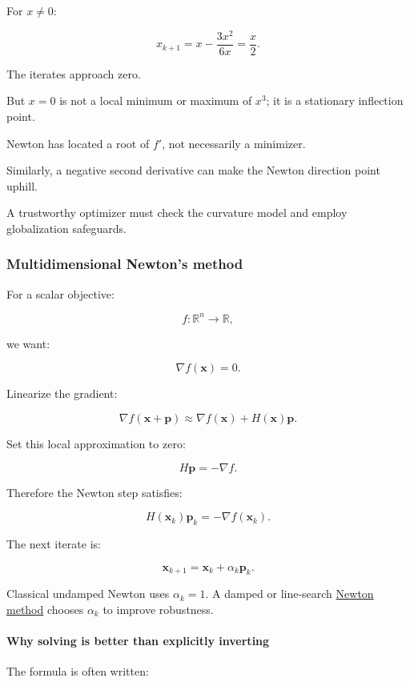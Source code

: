 For \(x\ne0\):

\[
x_{k+1} = x-\frac{3x^2}{6x} =\frac x2.
\]

The iterates approach zero.

But \(x=0\) is not a local minimum or maximum of \(x^3\); it is a stationary inflection point.

Newton has located a root of \(f'\), not necessarily a minimizer.

Similarly, a negative second derivative can make the Newton direction point uphill.

A trustworthy optimizer must check the curvature model and employ globalization safeguards.

\subsubsection{Multidimensional Newton's method}\label{02-foundations-ii-ch026-multidimensional-newtons-method}

For a scalar objective:

\[
f:\mathbb R^n\to\mathbb R,
\]

we want:

\[
\nabla f(\mathbf x)=0.
\]

Linearize the gradient:

\[
\nabla f(\mathbf x+\mathbf p) \approx \nabla f(\mathbf x)+H(\mathbf x)\mathbf p.
\]

Set this local approximation to zero:

\[
H\mathbf p=-\nabla f.
\]

Therefore the Newton step satisfies:

\[
\boxed{ H(\mathbf x_k)\mathbf p_k=-\nabla f(\mathbf x_k) }.
\]

The next iterate is:

\[
\mathbf x_{k+1}=\mathbf x_k+\alpha_k\mathbf p_k.
\]

Classical undamped Newton uses \(\alpha_k=1\). A damped or line-search \hyperref[02-foundations-ii-ch026-optimization-and-inverse-problems]{Newton method} chooses \(\alpha_k\) to improve robustness.

\paragraph{Why solving is better than explicitly inverting}\label{02-foundations-ii-ch026-why-solving-is-better-than-explicitly-inverting}

The formula is often written:

